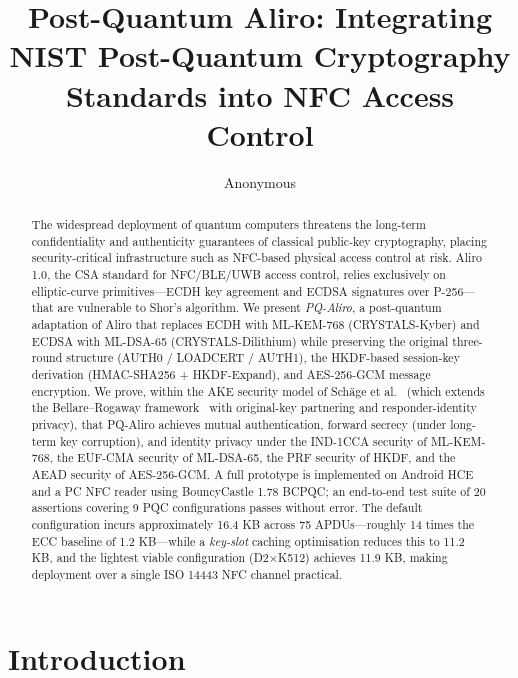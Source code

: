 \documentclass[runningheads]{llncs}
\begin{document}
\title{Post-Quantum Aliro: Integrating NIST Post-Quantum Cryptography Standards into NFC Access Control}

\author{Anonymous}

\maketitle

\begin{abstract}
The widespread deployment of quantum computers threatens the long-term confidentiality and
authenticity guarantees of classical public-key cryptography, placing security-critical
infrastructure such as NFC-based physical access control at risk.
Aliro 1.0, the CSA standard for NFC/BLE/UWB access control, relies exclusively on
elliptic-curve primitives---ECDH key agreement and ECDSA signatures over P-256---that are
vulnerable to Shor's algorithm.
We present \emph{PQ-Aliro}, a post-quantum adaptation of Aliro that replaces ECDH with
ML-KEM-768 (CRYSTALS-Kyber) and ECDSA with ML-DSA-65 (CRYSTALS-Dilithium) while
preserving the original three-round structure (AUTH0 / LOADCERT / AUTH1), the HKDF-based
session-key derivation (HMAC-SHA256 + HKDF-Expand), and AES-256-GCM message encryption.
We prove, within the AKE security model of Sch{\"a}ge et al.~\cite{PKC:SchSchLau20} (which extends the Bellare--Rogaway framework~\cite{C:BelRog93} with original-key partnering and responder-identity privacy), that PQ-Aliro achieves mutual authentication, forward secrecy (under long-term key corruption), and identity privacy under the IND-1CCA security of ML-KEM-768, the EUF-CMA security of ML-DSA-65, the PRF security of HKDF, and the AEAD security of AES-256-GCM.
A full prototype is implemented on Android HCE and a PC NFC reader using BouncyCastle 1.78
BCPQC; an end-to-end test suite of 20 assertions covering 9 PQC configurations passes
without error.
The default configuration incurs approximately 16.4 KB across 75 APDUs---roughly 14 times
the ECC baseline of 1.2 KB---while a \emph{key-slot} caching optimisation reduces this to
11.2 KB, and the lightest viable configuration (D2$\times$K512) achieves 11.9 KB, making
deployment over a single ISO 14443 NFC channel practical.
\end{abstract}

\section{Introduction}
\end{document}
